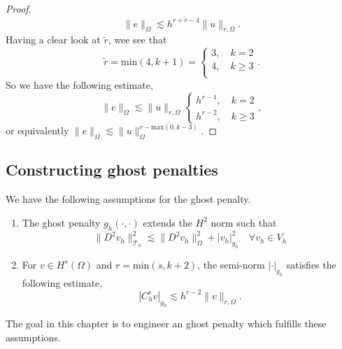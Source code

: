 \documentclass[11pt]{article}
\theoremstyle{remark}
\newcommand{\abs}[1]{\left\lvert #1 \right\rvert}
\renewcommand{\ge}{\geqslant}
\numberwithin{equation}{section}
\begin{document}
\begin{proof}
\begin{equation}
            \| e \|_{\Omega   }^{  } \lesssim h^{r+ \widetilde{r} -4} \| u \|_{ r,\Omega   }^{  }.
        \end{equation}
        Having a clear look at $\widetilde{r}$, wee see that \begin{equation}
            \widetilde{r} = \mathrm{min}(4, k+1) = \begin{cases}
                 3, \quad  k=2 \\
                 4, \quad  k\ge 3 \\
            \end{cases}.
        \end{equation}
        So we have the following estimate,\begin{equation}
            \| e \|_{ \Omega  }^{  }  \lesssim  \| u \|_{ r,\Omega  }^{  }  \begin{cases}
                h^{r-1}, \quad k=2 \\
                h^{r-2}, \quad k\ge 3
            \end{cases},
        \end{equation}
        or equivalently $\| e \|_{\Omega   }^{  } \lesssim \| u \|_{\Omega   }^{r- \mathrm{max}(0,k-3)   } $.


\end{proof}



\subsection{Constructing ghost penalties}%
\label{sec:constructing_ghost_penalties}

We have the following assumptions for the ghost penalty.
\begin{enumerate}[label=\textbf{EP\arabic*}]
    \item \label{as:EP1} The ghost penalty $g_{h}( \cdot ,\cdot ) $ extends the $H^{2}$ norm such that
        \begin{equation}
    \| D^2v_{h} \|_{ \mathcal{T} _{h} }^{ 2 }  \lesssim \| D^2 v_{h} \|_{ \Omega  }^{  2} + \abs{ v_{h} } _{g_{h}}^2 \quad \forall v_{h} \in V_{h}
        \end{equation}
\item \label{as:EP2} For $v \in H^{s}( \Omega ) $ and $r = \mathrm{ min} (s,k+2) $, the semi-norm $\abs{ \cdot  }_{g_{h}} $ satisfies the following estimate,
    \begin{equation}
    \abs{ C _{h}^{e} v } _{g_{h}} \lesssim  h^{r-2} \| v \|_{ r,\Omega  }^{  }.
    \end{equation}
\end{enumerate}
The goal in this chapter is to engineer an ghost penalty which fulfills these assumptions.
\end{document}
